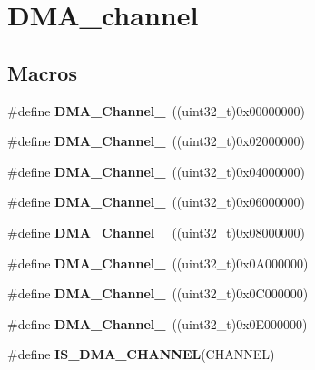\hypertarget{group___d_m_a__channel}{}\section{D\+M\+A\+\_\+channel}
\label{group___d_m_a__channel}
\subsection*{Macros}
\begin{DoxyCompactItemize}
\item 
\hypertarget{group___d_m_a__channel_ga4979fc18bd59701dec52c8fa89b5edb2}{}\#define {\bfseries D\+M\+A\+\_\+\+Channel\+\_}~((uint32\+\_\+t)0x00000000)\label{group___d_m_a__channel_ga4979fc18bd59701dec52c8fa89b5edb2}

\item 
\hypertarget{group___d_m_a__channel_gacad41f71e3a940abd495b0aab3b4e8cb}{}\#define {\bfseries D\+M\+A\+\_\+\+Channel\+\_}~((uint32\+\_\+t)0x02000000)\label{group___d_m_a__channel_gacad41f71e3a940abd495b0aab3b4e8cb}

\item 
\hypertarget{group___d_m_a__channel_ga6b5d9fcfd72335777ce2796af6300574}{}\#define {\bfseries D\+M\+A\+\_\+\+Channel\+\_}~((uint32\+\_\+t)0x04000000)\label{group___d_m_a__channel_ga6b5d9fcfd72335777ce2796af6300574}

\item 
\hypertarget{group___d_m_a__channel_gaf835103c99f21d1b1c04d5c98471c1d5}{}\#define {\bfseries D\+M\+A\+\_\+\+Channel\+\_}~((uint32\+\_\+t)0x06000000)\label{group___d_m_a__channel_gaf835103c99f21d1b1c04d5c98471c1d5}

\item 
\hypertarget{group___d_m_a__channel_gac8a40bf3a421b434177e988263a3d787}{}\#define {\bfseries D\+M\+A\+\_\+\+Channel\+\_}~((uint32\+\_\+t)0x08000000)\label{group___d_m_a__channel_gac8a40bf3a421b434177e988263a3d787}

\item 
\hypertarget{group___d_m_a__channel_gae3dd5d28def40846aea8e3013d63311b}{}\#define {\bfseries D\+M\+A\+\_\+\+Channel\+\_}~((uint32\+\_\+t)0x0\+A000000)\label{group___d_m_a__channel_gae3dd5d28def40846aea8e3013d63311b}

\item 
\hypertarget{group___d_m_a__channel_ga141e89570dabba4f778e8e8df80e7812}{}\#define {\bfseries D\+M\+A\+\_\+\+Channel\+\_}~((uint32\+\_\+t)0x0\+C000000)\label{group___d_m_a__channel_ga141e89570dabba4f778e8e8df80e7812}

\item 
\hypertarget{group___d_m_a__channel_ga14f1265827ce49dad5075986118cc542}{}\#define {\bfseries D\+M\+A\+\_\+\+Channel\+\_}~((uint32\+\_\+t)0x0\+E000000)\label{group___d_m_a__channel_ga14f1265827ce49dad5075986118cc542}

\item 
\#define {\bfseries I\+S\+\_\+\+D\+M\+A\+\_\+\+C\+H\+A\+N\+N\+E\+L}(C\+H\+A\+N\+N\+E\+L)
\end{DoxyCompactItemize}


